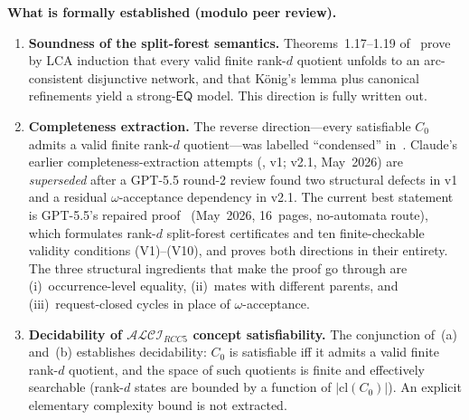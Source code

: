 \documentclass[a4paper,11pt]{article}
\theoremstyle{definition}
\newcommand{\ALCIRCC}[1]{\ensuremath{\mathcal{ALCI}_{\mathit{RCC#1}}}}
\newcommand{\EQ}{\ensuremath{\mathsf{EQ}}}
\begin{document}
\medskip\noindent\textbf{What is formally established (modulo peer
review).}
\begin{enumerate}[label=(\alph*)]
  \item \textbf{Soundness of the split-forest semantics.}
    Theorems~1.17--1.19 of~\cite{SiblingCompleted} prove by LCA
    induction that every valid finite rank-$d$ quotient unfolds to
    an arc-consistent disjunctive network, and that K\"onig's
    lemma plus canonical refinements yield a strong-$\EQ$ model.
    This direction is fully written out.

  \item \textbf{Completeness extraction.}
    The reverse direction---every satisfiable
    $C_0$ admits a valid finite rank-$d$
    quotient---was labelled ``condensed'' in~\cite{SiblingCompleted}.
    Claude's earlier completeness-extraction
    attempts (\cite{CompletenessExtractionV1}, v1; v2.1, May~2026) are
    \emph{superseded} after a GPT-5.5 round-2 review found
    two structural defects in v1 and a residual
    $\omega$-acceptance dependency in v2.1.  The current best
    statement is GPT-5.5's repaired
    proof~\cite{GPT55Repaired} (May~2026, 16~pages, no-automata
    route), which formulates rank-$d$ split-forest certificates
    and ten finite-checkable validity conditions (V1)--(V10), and
    proves both directions in their entirety.  The three structural
    ingredients that make the proof go through are (i)~occurrence-level
    equality, (ii)~mates with different parents, and
    (iii)~request-closed cycles in place of $\omega$-acceptance.

  \item \textbf{Decidability of $\ALCIRCC{5}$ concept satisfiability.}
    The conjunction of~(a) and~(b) establishes decidability:
    $C_0$ is satisfiable iff it admits a valid finite rank-$d$
    quotient, and the space of such quotients is finite and
    effectively searchable (rank-$d$ states are bounded by a
    function of $|\mathrm{cl}(C_0)|$).  An explicit elementary
    complexity bound is not extracted.
\end{enumerate}
\end{document}
